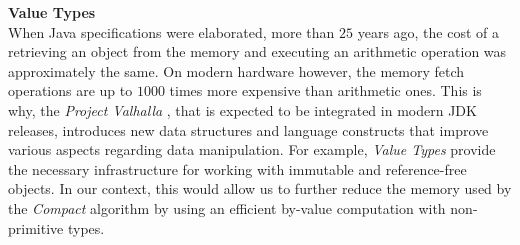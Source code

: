 \documentclass[a4paper,twoside]{article}
\begin{document}
\textbf{Value Types} \\
When Java specifications were elaborated, more than $25$ years ago, the cost of a retrieving an object from the memory and executing an arithmetic operation was approximately the same. On modern hardware however, the memory fetch operations are up to $1000$ times more expensive than arithmetic ones.
This is why, the {\it Project Valhalla} \cite{jdk:valhalla}, that is expected to be integrated in modern JDK releases, introduces new data structures and language constructs that improve various aspects regarding data manipulation. For example, {\it Value Types} provide the necessary infrastructure for working with immutable and reference-free objects. In our context, this would allow us to further reduce the memory used by the {\it Compact} algorithm by using an efficient by-value computation with non-primitive types. 


%
%
\end{document}
